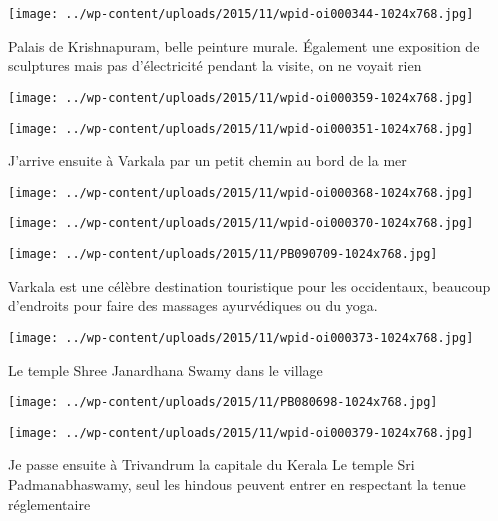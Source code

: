  \newline
 \newline
\centerline{\texttt{[image: ../wp-content/uploads/2015/11/wpid-oi000344-1024x768.jpg]} } 
 \newline
 Palais de Krishnapuram, belle peinture murale. Également une exposition de sculptures mais pas d'électricité pendant la visite, on ne voyait rien \newline
 \newline
\centerline{\texttt{[image: ../wp-content/uploads/2015/11/wpid-oi000359-1024x768.jpg]} } 
 \newline
 \newline
\centerline{\texttt{[image: ../wp-content/uploads/2015/11/wpid-oi000351-1024x768.jpg]} } 
 \newline
 J'arrive ensuite à Varkala par un petit chemin au bord de la mer \newline
 \newline
\centerline{\texttt{[image: ../wp-content/uploads/2015/11/wpid-oi000368-1024x768.jpg]} } 
 \newline
 \newline
\centerline{\texttt{[image: ../wp-content/uploads/2015/11/wpid-oi000370-1024x768.jpg]} } 
 \newline
 \newline
\centerline{\texttt{[image: ../wp-content/uploads/2015/11/PB090709-1024x768.jpg]} } 
 \newline
 Varkala est une célèbre destination touristique pour les occidentaux, beaucoup d'endroits pour faire des massages ayurvédiques ou du yoga. \newline
 \newline
\centerline{\texttt{[image: ../wp-content/uploads/2015/11/wpid-oi000373-1024x768.jpg]} } 
 \newline
 Le temple Shree Janardhana Swamy dans le village \newline
 \newline
\centerline{\texttt{[image: ../wp-content/uploads/2015/11/PB080698-1024x768.jpg]} } 
 \newline
 \newline
\centerline{\texttt{[image: ../wp-content/uploads/2015/11/wpid-oi000379-1024x768.jpg]} } 
 \newline
 Je passe ensuite à Trivandrum la capitale du Kerala \newline
 Le temple Sri Padmanabhaswamy, seul les hindous peuvent entrer en respectant la tenue réglementaire \newline
